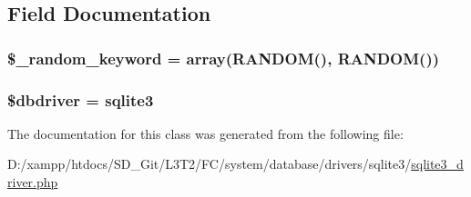 \subsection{Field Documentation}
\hypertarget{class_c_i___d_b__sqlite3__driver_a10213aa6e05f6d924d3277bb1d2fea00}{}
\subsubsection[{\$\+\_\+random\+\_\+keyword}]{\setlength{\rightskip}{0pt plus 5cm}\$\+\_\+random\+\_\+keyword = array(\textquotesingle{}R\+A\+N\+D\+O\+M()\textquotesingle{}, \textquotesingle{}R\+A\+N\+D\+O\+M()\textquotesingle{})\hspace{0.3cm}{\ttfamily [protected]}}\label{class_c_i___d_b__sqlite3__driver_a10213aa6e05f6d924d3277bb1d2fea00}
\hypertarget{class_c_i___d_b__sqlite3__driver_a0cde2a16322a023d040aa7f725877597}{}
\subsubsection[{\$dbdriver}]{\setlength{\rightskip}{0pt plus 5cm}\$dbdriver = \textquotesingle{}sqlite3\textquotesingle{}}\label{class_c_i___d_b__sqlite3__driver_a0cde2a16322a023d040aa7f725877597}


The documentation for this class was generated from the following file\+:\begin{DoxyCompactItemize}
\item 
D\+:/xampp/htdocs/\+S\+D\+\_\+\+Git/\+L3\+T2/\+F\+C/system/database/drivers/sqlite3/\hyperlink{sqlite3__driver_8php}{sqlite3\+\_\+driver.\+php}\end{DoxyCompactItemize}
